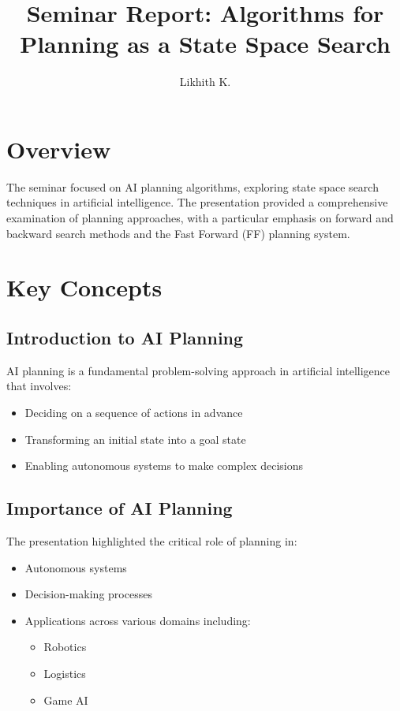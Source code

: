 \documentclass[12pt]{article}
\title{Seminar Report: Algorithms for Planning as a State Space Search}
\author{Likhith K.}
\date{}
\begin{document}
\maketitle

\section{Overview}
The seminar focused on AI planning algorithms, exploring state space search techniques in artificial intelligence. The presentation provided a comprehensive examination of planning approaches, with a particular emphasis on forward and backward search methods and the Fast Forward (FF) planning system.

\section{Key Concepts}

\subsection{Introduction to AI Planning}
AI planning is a fundamental problem-solving approach in artificial intelligence that involves:
\begin{itemize}
    \item Deciding on a sequence of actions in advance
    \item Transforming an initial state into a goal state
    \item Enabling autonomous systems to make complex decisions
\end{itemize}

\subsection{Importance of AI Planning}
The presentation highlighted the critical role of planning in:
\begin{itemize}
    \item Autonomous systems
    \item Decision-making processes
    \item Applications across various domains including:
    \begin{itemize}
        \item Robotics
        \item Logistics
        \item Game AI
    \end{itemize}
\end{itemize}
\end{document}

